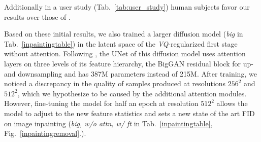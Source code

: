 Additionally in a user study (Tab.~\ref{tab:user_study}) human subjects favor our results over those of \cite{lama}.

Based on these initial results, we also trained a larger diffusion model
(\emph{big} in Tab.~\ref{inpaintingtable}) in the latent space of the \emph{VQ}-regularized first stage without attention. Following \cite{DBLP:journals/corr/abs-2105-05233}, the UNet of this diffusion model uses attention layers on three levels of its feature hierarchy, the BigGAN \cite{bigganbrock} residual block for up- and downsampling and has 387M parameters instead of 215M. After training, we noticed a discrepancy in the quality of samples produced at resolutions $256^2$ and $512^2$, which we hypothesize to be caused by the additional attention modules. However, fine-tuning the model for half an epoch at resolution $512^2$ allows the model to adjust to the new feature statistics and sets a new state of the art FID on image inpainting (\emph{big, w/o attn, w/ ft} in Tab.~\ref{inpaintingtable}, Fig.~\ref{inpaintingremoval}.).

